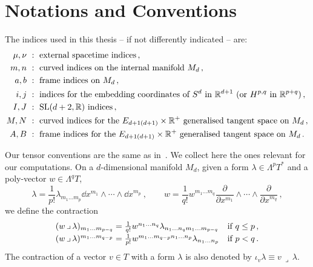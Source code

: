 \documentclass[debug]{phd}
\begin{document}
	\chapter{Notations and Conventions}
	\label{app:notation}
			The indices used in this thesis -- if not differently indicated -- are:
					\begin{align*}
						\mu, \nu  \ &: \ \text{external spacetime indices} \, ,\\
						m,n \ &:\ \text{curved indices on the internal manifold $M_d$} \, ,\\
						a,b \ &:\ \text{frame indices on $M_d$} \, ,\\
						i,j \ &:\ \text{indices for the embedding coordinates of $S^d$ in $\mathbb R^{d+1}$ (or $H^{p,q}$ in $\mathbb{R}^{p+q}$)} \, ,\\
						I,J \ &:\ \text{$\mathrm{SL}(d+2,\mathbb{R})$ indices}\, , \\
						M,N \ &: \ \text{curved indices for the $E_{d+1(d+1)}\times \mathbb{R}^+$ generalised tangent space on $M_d$} \, ,\\
						A,B \ &: \ \text{frame indices for the $E_{d+1(d+1)}\times \mathbb{R}^+$ generalised tangent space on $M_d$} \, .
					\end{align*}

			Our tensor conventions are the same as in~\cite{waldram2}. 
			We collect here the ones relevant for our computations. 
			On a $d$-dimensional manifold $M_d$, given a form $\lambda \in \Lambda^p T^*$ and a poly-vector $w \in \Lambda^q T$, 
					\begin{equation}
						\lambda = \frac{1}{p!} \lambda_{m_1\ldots m_p} \dd x^{m_1} \wedge \cdots \wedge \dd x^{m_p}\ ,\qquad w = \frac{1}{q!} w^{m_1 \ldots m_q} \frac{\partial}{\partial x^{m_1}}\wedge \cdots \wedge\frac{\partial}{\partial x^{m_q}} \,,
					\end{equation}
			we define the contraction
					\begin{equation}\label{deflrcorner}
						\begin{array}{l r}
							(w \,\lrcorner\,\lambda)_{m_1\ldots m_{p-q}} = \frac{1}{q!}w^{n_1 \ldots n_q}\lambda_{n_1\ldots n_q m_1 \ldots m_{p-q}} &\mbox{if}\ q \leq p \, , \\[1mm]
							(w \,\lrcorner\,\lambda)^{m_1\ldots m_{q-p}} = \frac{1}{p!}w^{m_1 \ldots m_{q-p}n_1 \ldots n_p}\lambda_{n_1\ldots n_p} &\mbox{if}\ p< q\, .
						\end{array}
					\end{equation}
			The contraction of a vector $v\in T$ with a form $\lambda$ is also denoted by $\iota_v \lambda \equiv v\,\lrcorner \,\lambda$.
\end{document}
